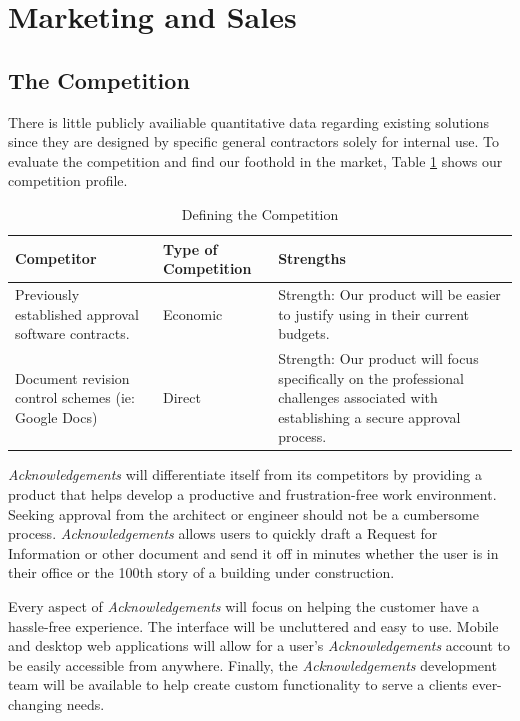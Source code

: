 \section{Marketing and Sales}

\subsection{The Competition}
There is little publicly availiable quantitative data regarding existing solutions since they are designed by specific general contractors solely for internal use. To evaluate the competition and find our foothold in the market, Table \ref{competition} shows our competition profile.

\begin{table}[ht]
	\caption{Defining the Competition} %
	\centering %
	\begin{tabular}{| p{2in} | p{1in} | p{2in} |} %
		\hline
		{\bf Competitor} & {\bf Type of {\mbox Competition}} & {\bf Strengths} \\ \hline
		Previously established approval software contracts. & Economic & Strength: Our product will be easier to justify using in their current budgets.\\ \hline %
		Document revision control schemes (ie: Google Docs) & Direct & Strength: Our product will focus specifically on the professional challenges associated with establishing a secure approval process. \\ \hline
	\end{tabular}
	\label{competition} %
\end{table}

{\it Acknowledgements} will differentiate itself from its competitors by providing a product that helps develop a productive and frustration-free work environment. Seeking approval from the architect or engineer should not be a cumbersome process. {\it Acknowledgements} allows users to quickly draft a Request for Information or other document and send it off in minutes whether the user is in their office or the 100th story of a building under construction. 

Every aspect of {\it Acknowledgements} will focus on helping the customer have a hassle-free experience. The interface will be uncluttered and easy to use. Mobile and desktop web applications will allow for a user's {\it Acknowledgements} account to be easily accessible from anywhere. Finally, the {\it Acknowledgements} development team will be available to help create custom functionality to serve a clients ever-changing needs.

